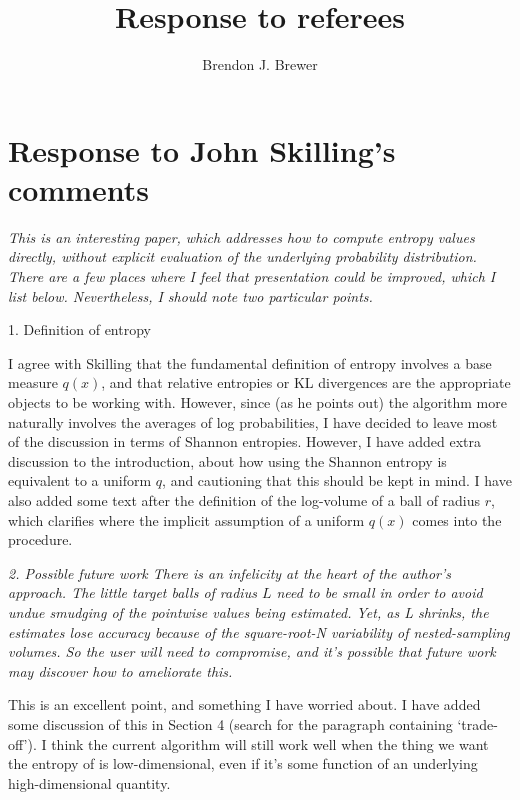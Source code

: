 \documentclass[a4paper, 12pt]{article}
\title{Response to referees}
\author{Brendon J. Brewer}
\date{}
\renewcommand{\quote}{\em \color{orange}}
\begin{document}
\maketitle


\setlength{\parindent}{0pt}
\setlength{\parskip}{8pt}

\section*{Response to John Skilling's comments}

{\quote
This is an interesting paper, which addresses how to compute entropy values directly, without explicit
evaluation of the underlying probability distribution. There are a few places where I feel that presentation
could be improved, which I list below. Nevertheless, I should note two particular points.

1. Definition of entropy}

I agree with Skilling that the fundamental definition of entropy involves
a base measure $q(x)$, and that relative entropies or KL divergences are the
appropriate objects to be working with. However, since (as he points out)
the algorithm more naturally involves the averages of log probabilities,
I have decided to leave most of the discussion in terms of Shannon entropies.
However, I have added extra discussion to the introduction, about how using
the Shannon entropy is equivalent to a uniform $q$, and cautioning that
this should be kept in mind. I have also added some text after the definition
of the log-volume of a ball of radius $r$, which clarifies where the implicit
assumption of a uniform $q(x)$ comes into the procedure.

{\quote
2. Possible future work
There is an infelicity at the heart of the author’s approach. The little target balls of radius $L$ need to be
small in order to avoid undue smudging of the pointwise values being estimated. Yet, as L shrinks, the
estimates lose accuracy because of the square-root-N variability of nested-sampling volumes. So the user
will need to compromise, and it’s possible that future work may discover how to ameliorate this.}

This is an excellent point, and something I have worried about. I have added
some discussion of this in Section 4 (search for the paragraph containing
`trade-off'). I think the current algorithm will still work well when the
thing we want the entropy of is low-dimensional, even if it's some function of
an underlying high-dimensional quantity.
\end{document}
